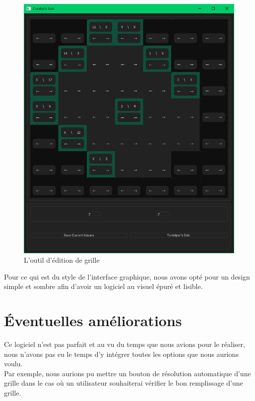 \documentclass[12pt]{article}
\begin{document}
 \begin{figure}[ht]
  \begin{center}
    \includegraphics[scale=0.4]{./ressources/creator.png} 
  \end{center}
  \caption{L'outil d'édition de grille}
\end{figure}
Pour ce qui est du style de l'interface graphique, nous avons opté pour un design simple et sombre afin d'avoir un logiciel au visuel épuré et lisible. 
\section{Éventuelles améliorations}
Ce logiciel n'est pas parfait et au vu du temps que nous avions pour le réaliser, nous n'avons pas eu le temps d'y intégrer toutes les options que nous aurions voulu. \\
Par exemple, nous aurions pu mettre un bouton de résolution automatique d'une grille dans le cas où un utilisateur souhaiterai vérifier le bon remplissage d'une grille. \\
\end{document}
